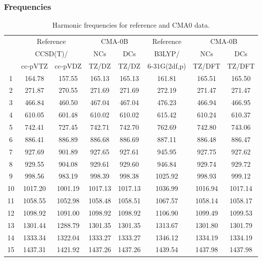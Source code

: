 \documentclass[10pt,oneside]{article}
\begin{document}
\subsubsection*{Frequencies}
\begin{table}[h!]
\centering
\caption{Harmonic frequencies for reference and CMA0 data.}
\begin{tabular}{cccccccc}
\toprule
{} & \multicolumn{2}{c}{Reference} & \multicolumn{2}{c}{CMA-0B} &    Reference & \multicolumn{2}{c}{CMA-0B} \\
{} & \multicolumn{2}{c}{CCSD(T)/} &     NCs &     DCs &       B3LYP/ &     NCs &     DCs \\
{} &   cc-pVTZ & cc-pVDZ &   TZ/DZ &   TZ/DZ & 6-31G(2df,p) &  TZ/DFT &  TZ/DFT \\
\midrule
1  &    164.78 &  157.55 &  165.13 &  165.13 &       161.81 &  165.51 &  165.50 \\
2  &    271.87 &  270.55 &  271.69 &  271.69 &       272.19 &  271.47 &  271.47 \\
3  &    466.84 &  460.50 &  467.04 &  467.04 &       476.23 &  466.94 &  466.95 \\
4  &    610.05 &  601.48 &  610.02 &  610.02 &       615.42 &  610.24 &  610.37 \\
5  &    742.41 &  727.45 &  742.71 &  742.70 &       762.69 &  742.80 &  743.06 \\
6  &    886.41 &  886.89 &  886.68 &  886.69 &       887.11 &  886.48 &  886.47 \\
7  &    927.69 &  901.89 &  927.65 &  927.61 &       945.95 &  927.75 &  927.62 \\
8  &    929.55 &  904.08 &  929.61 &  929.60 &       946.84 &  929.74 &  929.72 \\
9  &    998.56 &  983.19 &  998.39 &  998.38 &      1025.92 &  998.93 &  999.12 \\
10 &   1017.20 & 1001.19 & 1017.13 & 1017.13 &      1036.99 & 1016.94 & 1017.14 \\
11 &   1058.55 & 1052.98 & 1058.48 & 1058.51 &      1067.57 & 1058.14 & 1058.17 \\
12 &   1098.92 & 1091.00 & 1098.92 & 1098.92 &      1106.90 & 1099.49 & 1099.53 \\
13 &   1301.44 & 1288.79 & 1301.35 & 1301.35 &      1313.67 & 1301.80 & 1301.79 \\
14 &   1333.34 & 1322.04 & 1333.27 & 1333.27 &      1346.12 & 1334.19 & 1334.19 \\
15 &   1437.31 & 1421.92 & 1437.26 & 1437.26 &      1439.54 & 1437.98 & 1437.98 \\

\end{tabular}
\end{table}
\end{document}
